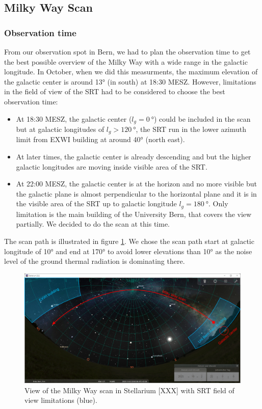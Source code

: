 \subsection{Milky Way Scan}

\subsubsection{Observation time}
From our observation spot in Bern, we had to plan the observation time to get the best possible overview of the Milky Way with a wide range in the galactic longitude. In October, when we did this measurments, the maximum elevation of the galactic center is around 13° (in south) at 18:30 MESZ. However, limitations in the field of view of the SRT had to be considered to choose the best observation time:

\begin{itemize}
    \item At 18:30 MESZ, the galactic center ($l_g=\SI{0}{\degree}$) could be included in the scan but at galactic longitudes of $l_g>\SI{120}{\degree}$, the SRT run in the lower azimuth limit from EXWI building at around 40° (north east).
    \item At later times, the galactic center is already descending and but the higher galactic longitudes are moving inside visible area of the SRT.
    \item At 22:00 MESZ, the galactic center is at the horizon and no more visible but the galactic plane is almost perpendicular to the horizontal plane and it is in the visible area of the SRT up to galactic longitude $l_g=\SI{180}{\degree}$. Only limitation is the main building of the University Bern, that covers the view partially. We decided to do the scan at this time. 
\end{itemize}
    
The scan path is illustrated in figure \ref{fig:mw_scan_stellarium}. We chose the scan path start at galactic longitude of 10° and end at 170° to avoid lower elevations than 10° as the noise level of the ground thermal radiation is dominating there.


\begin{figure}[H]
    \centering
    \includegraphics[width=12cm]{assets/stellariumView_edit.png}
    \caption{View of the Milky Way scan in Stellarium [XXX] with SRT field of view limitations (blue).}
    \label{fig:mw_scan_stellarium}
\end{figure}

